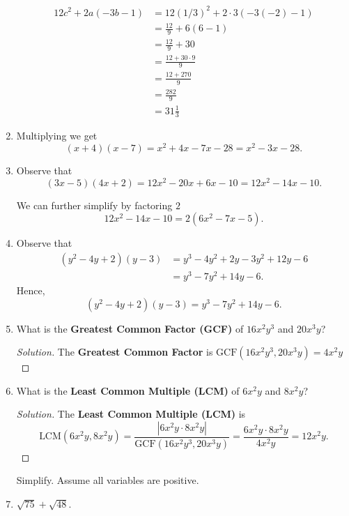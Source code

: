 \documentclass{article}
\begin{document}
\begin{enumerate}
    \begin{align*}
        12c^2 + 2a(-3b - 1)&= 12(1/3)^2 + 2\cdot3(-3(-2) - 1 ) \\ 
                           &= \frac{12}{9} + 6(6-1) \\ 
                           &= \frac{12}{9} + 30 \\ 
                           &= \frac{12 + 30 \cdot 9 }{9} \\
                           &= \frac{12 + 270}{9} \\
                           &= \frac{282}{9} \\
                           &= 31\frac{1}{3}  \tag{\(\Leftarrow\) mixed fraction!}
    \end{align*} 
\item Multiplying we get \[ (x+4)(x-7) = x^2 + 4x - 7x -28 = x^2 -3x -28.\]
\item Observe that \[ (3x-5)(4x+2) = 12x^2 -20x + 6x -10 = 12x^2 -14x - 10.\]

    We can further simplify by factoring \(2\)  
    \[ 12x^2 -14x - 10 = 2(6x^2 - 7x - 5).\]
\item Observe that 
    \begin{align*}
        (y^2 - 4y + 2 )(y-3) &= y^3 -4y^2 +2y -3y^2 +12y - 6  \\
                             &= y^3 -7y^2 +14y - 6.
    \end{align*}
    Hence, 
    \[ (y^2 - 4y + 2 )(y-3) = y^3 -7y^2 +14y - 6.\]

\item What is the \textbf{Greatest Common Factor (GCF)} of \( 16x^2y^3\) and \(20x^3y\)?
    \begin{proof}[Solution]
        The \textbf{Greatest Common Factor} is \( \text{GCF}(16x^2y^3, 20x^3y) = 4x^2y\)
    \end{proof}
\item What is the \textbf{Least Common Multiple (LCM)} of \( 6x^2y\) and \( 8x^2y\)?
    \begin{proof}[Solution]
        The \textbf{Least Common Multiple (LCM)} is
        \[ \text{LCM}(6x^2y, 8x^2y) = \frac{|6x^2y \cdot 8x^2y|}{\text{GCF}(16x^2y^3, 20x^3y)} = \frac{6x^2y \cdot 8x^2y}{4x^2y} = 12 x^2 y .\]
    \end{proof}

Simplify. Assume all variables are positive.

\item \( \sqrt{75} + \sqrt{48}. \) 


\end{enumerate}
\end{document}
